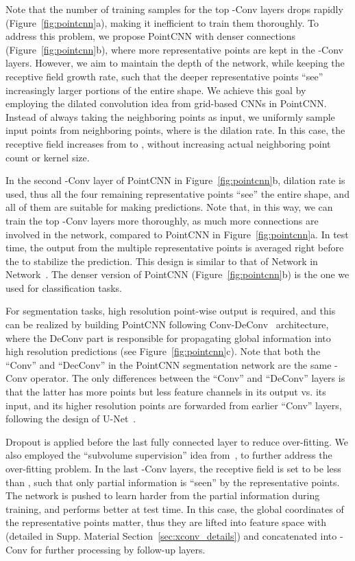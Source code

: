 \documentclass{article}
\begin{document}
Note that the number of training samples for the top -Conv layers drops rapidly (Figure~\ref{fig:pointcnn}a), making it inefficient to train them thoroughly. To address this problem, we propose PointCNN with denser connections (Figure~\ref{fig:pointcnn}b), where more representative points are kept in the -Conv layers. However, we aim to maintain the depth of the network, while keeping the receptive field growth rate, such that the deeper representative points ``see'' increasingly larger portions of the entire shape. We achieve this goal by employing the dilated convolution idea from grid-based CNNs in PointCNN. Instead of always taking the  neighboring points as input, we uniformly sample  input points from   neighboring points, where  is the dilation rate. In this case, the receptive field increases from  to , without increasing actual neighboring point count or kernel size.

In the second -Conv layer of PointCNN in Figure~\ref{fig:pointcnn}b, dilation rate  is used, thus all the four remaining representative points ``see'' the entire shape, and all of them are suitable for making predictions. Note that, in this way, we can train the top -Conv layers more thoroughly, as much more connections are involved in the network, compared to PointCNN in Figure~\ref{fig:pointcnn}a. In test time, the output from the multiple representative points is averaged right before the  to stabilize the prediction. This design is similar to that of Network in Network~\cite{Lin_ICLR14}. The denser version of PointCNN (Figure~\ref{fig:pointcnn}b) is the one we used for classification tasks.

For segmentation tasks, high resolution point-wise output is required, and this can be realized by building PointCNN following Conv-DeConv~\cite{Noh_ICCV15} architecture, where the DeConv part is responsible for propagating global information into high resolution predictions (see Figure~\ref{fig:pointcnn}c). Note that both the ``Conv'' and ``DecConv'' in the PointCNN segmentation network are the same -Conv operator. The only differences between the ``Conv'' and ``DeConv'' layers is that the latter has more points but less feature channels in its output vs. its input, and its higher resolution points are forwarded from earlier ``Conv'' layers, following the design of U-Net~\cite{Ronneberger_MICCAI15}.

Dropout is applied before the last fully connected layer to reduce over-fitting. We also employed the ``subvolume supervision'' idea from~\cite{Qi_CVPR16}, to further address the over-fitting problem. In the last -Conv layers, the receptive field is set to be less than , such that only partial information is ``seen'' by the representative points. The network is pushed to learn harder from the partial information during training, and performs better at test time. In this case, the global coordinates of the representative points matter, thus they are lifted into feature space  with  (detailed in Supp. Material Section~\ref{sec:xconv_details}) and concatenated into -Conv for further processing by follow-up layers.
\end{document}
